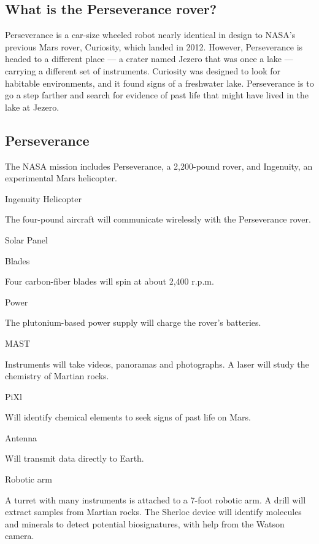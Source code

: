\hypertarget{what-is-the-perseverance-rover}{%
\subsection{What is the Perseverance
rover?}\label{what-is-the-perseverance-rover}}

Perseverance is a car-size wheeled robot nearly identical in design to
NASA's previous Mars rover, Curiosity, which landed in 2012. However,
Perseverance is headed to a different place --- a crater named Jezero
that was once a lake --- carrying a different set of instruments.
Curiosity was designed to look for habitable environments, and it found
signs of a freshwater lake. Perseverance is to go a step farther and
search for evidence of past life that might have lived in the lake at
Jezero.

\hypertarget{perseverance}{%
\subsection{Perseverance}\label{perseverance}}

The NASA mission includes Perseverance, a 2,200-pound rover, and
Ingenuity, an experimental Mars helicopter.

Ingenuity Helicopter

The four-pound aircraft will communicate wirelessly with the
Perseverance rover.

Solar Panel

Blades

Four carbon-fiber blades will spin at about 2,400 r.p.m.

Power

The plutonium-based power supply will charge the rover's batteries.

MAST

Instruments will take videos, panoramas and photographs. A laser will
study the chemistry of Martian rocks.

PiXl

Will identify chemical elements to seek signs of past life on Mars.

Antenna

Will transmit data directly to Earth.

Robotic arm

A turret with many instruments is attached to a 7-foot robotic arm. A
drill will extract samples from Martian rocks. The Sherloc device will
identify molecules and minerals to detect potential biosignatures, with
help from the Watson camera.

